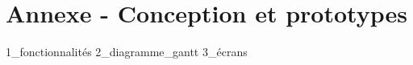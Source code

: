 \section{Annexe - Conception et prototypes} \label{sec:annexes_b}

{1_fonctionnalités}
{2_diagramme_gantt}
{3_écrans}
